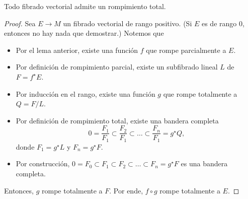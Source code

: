 \begin{lemma}
Todo fibrado vectorial admite un rompimiento total.
\end{lemma}

\begin{proof}
Sea $E \to M$ un fibrado vectorial de rango positivo. (Si $E$ es de rango $0$, entonces no hay nada que demostrar.) Notemos que
\begin{itemize}
    \itemsep 0em
    \item Por el lema anterior, existe una función $f$ que rompe parcialmente a $E$.
    \item Por definición de rompimiento parcial, existe un subfibrado lineal $L$ de $F = f^\star E$.
    \item Por inducción en el rango, existe una función $g$ que rompe totalmente a $Q = F/L$.
    \item Por definición de rompimiento total, existe una bandera completa
    $$0 = \dfrac {F_1} {F_1} \subset \dfrac {F_2} {F_1} \subset \dots \subset \dfrac {F_n} {F_1} = g^\star Q,$$
    donde $F_1 = g^\star L$ y $F_n = g^\star F$.
    
    \item Por construcción, $0 = F_0 \subset F_1 \subset F_2 \subset \dots \subset F_n = g^\star F$ es una bandera completa.
\end{itemize}
Entonces, $g$ rompe totalmente a $F$. Por ende, $f \circ g$ rompe totalmente a $E$.
\end{proof}
